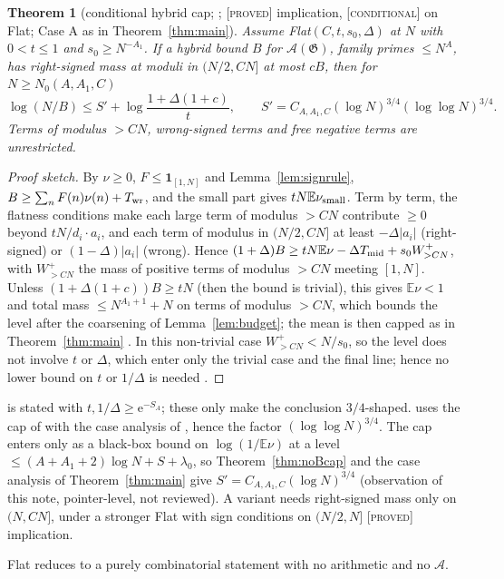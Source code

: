 \documentclass[10pt,reqno]{amsart}
\newtheorem{theorem}{Theorem}[section]
\theoremstyle{definition}
\theoremstyle{remark}
\newcommand{\A}{\mathcal A}
\newcommand{\cG}{\mathfrak G}
\newcommand{\E}{\mathbb E}
\newcommand{\ind}{\mathbf 1}
\newcommand{\e}{\mathrm e}
\newcommand{\lab}[1]{\textup{[\textsc{#1}]}}
\begin{document}
\begin{theorem}[conditional hybrid cap; {\cite[Thm~5.2]{IF2}}; \lab{proved} implication, \lab{conditional} on Flat; Case A as in Theorem~\ref{thm:main}]\label{thm:hybridcap}
Assume Flat$(C,t,s_0,\Delta)$ at $N$ with $0<t\leq1$ and $s_0\geq N^{-A_1}$.  If a
hybrid bound $B$ for $\A(\cG)$, family primes $\leq N^A$, has right-signed
mass at moduli in $(N/2,CN]$ at most $cB$, then for $N\geq N_0(A,A_1,C)$
\[
 \log(N/B)\leq S'+\log\frac{1+\Delta(1+c)}t,\qquad S'=C_{A,A_1,C}(\log N)^{3/4}(\log\log N)^{3/4}.
\]
Terms of modulus $>CN$, wrong-signed terms and free negative terms are
unrestricted.
\end{theorem}
\begin{proof}[Proof sketch]
By $\nu\geq0$, $F\leq\ind_{[1,N]}$ and Lemma~\ref{lem:signrule},
$B\geq\sum_nF(n)\nu(n)+T_{\rm wr}$, and the small part gives $tN\E\nu_{\rm small}$.
Term by term, the flatness conditions make each large term of modulus
$>CN$ contribute $\geq0$ beyond $tN/d_i\cdot a_i$, and each term of modulus in
$(N/2,CN]$ at least $-\Delta|a_i|$ (right-signed) or $(1-\Delta)|a_i|$ (wrong).
Hence $(1+\Delta)B\geq tN\E\nu-\Delta T_{\rm mid}+s_0W^+_{>CN}$, with $W^+_{>CN}$ the mass of
positive terms of modulus $>CN$ meeting $[1,N]$.  Unless $(1+\Delta(1+c))B\geq tN$
(then the bound is trivial), this gives $\E\nu<1$ and total mass $\leq N^{A_1+1}+N$ on
terms of modulus $>CN$, which bounds the level after the coarsening of
Lemma~\ref{lem:budget}; the mean is then capped as in Theorem~\ref{thm:main}
\cite[\S5]{IF2}.  In this non-trivial case $W^+_{>CN}<N/s_0$, so the level does not
involve $t$ or $\Delta$, which enter only the trivial case and the final line;
hence no lower bound on $t$ or $1/\Delta$ is needed \cite[Rem.~after Lemma~1.1]{SPW2}.
\end{proof}
\cite[Thm~5.2]{IF2} is stated with $t,1/\Delta\geq\e^{-S_A}$; these only make the
conclusion $3/4$-shaped.
\cite{IF2} uses the cap of \cite[Thm~5.1]{KA2} with the case analysis of
\cite[Cor.~6.1]{KA2}, hence the factor $(\log\log N)^{3/4}$.  The cap enters only
as a black-box bound on $\log(1/\E\nu)$ at a level $\leq(A+A_1+2)\log N+S+\lambda_0$, so
Theorem~\ref{thm:noBcap} and the case analysis of Theorem~\ref{thm:main} give
$S'=C_{A,A_1,C}(\log N)^{3/4}$ (observation of this note, pointer-level, not
reviewed).  A variant
\cite[Thm~5.2$'$]{IF2} needs right-signed mass only on $(N,CN]$, under a
stronger Flat with sign conditions on $(N/2,N]$ \lab{proved} implication.

Flat reduces to a purely combinatorial statement with no arithmetic and
no $\A$.
\end{document}
